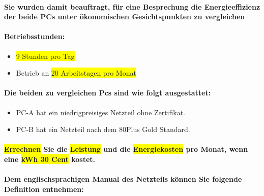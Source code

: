 \documentclass[a4paper]{article}
\begin{document}
            \paragraph{\color{codegreen}Sie wurden damit beauftragt, für eine Besprechung die Energieeffizienz der beide PCs unter ökonomischen Gesichtspunkten zu vergleichen}
            \paragraph{\color{red}Betriebsstunden:}
            \begin{itemize}
                \item \colorbox{yellow}{9 Stunden pro Tag}
                \item Betrieb an \colorbox{yellow}{20 Arbeitstagen pro Monat}
            \end{itemize}
            \paragraph{\color{red}Die beiden zu vergleichen Pcs sind wie folgt ausgestattet:}
            \begin{itemize}
                \color{magenta}
                \item PC-A hat ein niedrigpreisiges Netzteil ohne Zertifikat.
                \item PC-B hat ein Netzteil nach dem 80Plus Gold Standard.
            \end{itemize}
            \paragraph{\colorbox{yellow}{Errechnen} Sie die \colorbox{yellow}{Leistung} und die \colorbox{yellow}{Energiekosten} pro Monat, wenn eine \colorbox{yellow}{kWh 30 Cent} kostet.}
            \paragraph{\color{codegreen} Dem englischsprachigen Manual des Netzteils können Sie folgende Definition entnehmen:}
\end{document}

